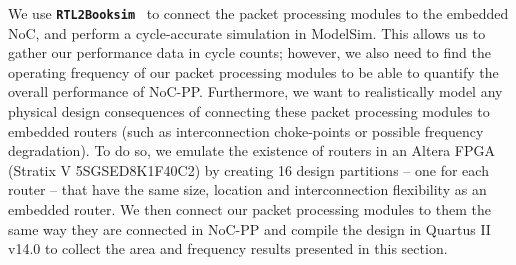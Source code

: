 
We use \texttt{\textbf{RTL2Booksim}}~\cite{fpl15demo} to connect the packet processing modules to the embedded NoC, and perform a cycle-accurate simulation in ModelSim. 
This allows us to gather our performance data in cycle counts; however, we also need to find the operating frequency of our packet processing modules to be able to quantify the overall performance of NoC-PP.
Furthermore, we want to realistically model any physical design consequences of connecting these packet processing modules to embedded routers (such as interconnection choke-points or possible frequency degradation).
To do so, we emulate the existence of routers in an Altera FPGA (Stratix V 5SGSED8K1F40C2) by creating 16 design partitions -- one for each router -- that have the same size, location and interconnection flexibility as an embedded router.
We then connect our packet processing modules to them the same way they are connected in NoC-PP and compile the design in Quartus II v14.0 to collect the area and frequency results presented in this section.

